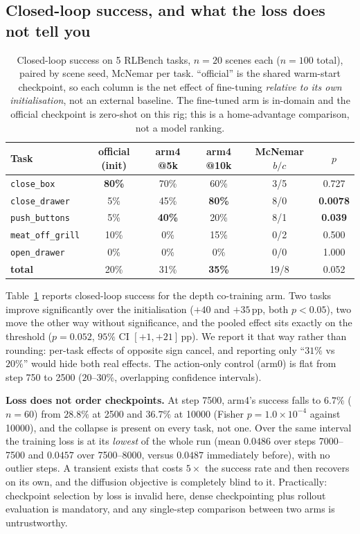 \documentclass{article} %
\newcommand{\best}[1]{\textbf{#1}}
\newcommand{\tabref}[1]{Table~\ref{#1}}
\begin{document}
\subsection{Closed-loop success, and what the loss does not tell you}

\begin{table}[t]
\caption{Closed-loop success on 5 RLBench tasks, $n{=}20$ scenes each ($n{=}100$ total), paired by
scene seed, McNemar per task. ``official'' is the shared warm-start checkpoint, so each column is
the net effect of fine-tuning \emph{relative to its own initialisation}, not an external baseline.
The fine-tuned arm is in-domain and the official checkpoint is zero-shot on this rig; this is a
home-advantage comparison, not a model ranking.}
\label{tab:closedloop}
\begin{center}\small
\begin{tabular}{lccccc}
\toprule
\textbf{Task} & official (init) & arm4 @5k & arm4 @10k & McNemar $b/c$ & $p$ \\
\midrule
\texttt{close\_box}       & \best{80\%} & 70\% & 60\% & 3/5 & 0.727 \\
\texttt{close\_drawer}    & 5\%  & 45\% & \best{80\%} & 8/0 & \best{0.0078} \\
\texttt{push\_buttons}    & 5\%  & \best{40\%} & 20\% & 8/1 & \best{0.039} \\
\texttt{meat\_off\_grill} & 10\% & 0\%  & 15\% & 0/2 & 0.500 \\
\texttt{open\_drawer}     & 0\%  & 0\%  & 0\%  & 0/0 & 1.000 \\
\midrule
\textbf{total} & 20\% & 31\% & \best{35\%} & 19/8 & 0.052 \\
\bottomrule
\end{tabular}
\end{center}
\end{table}

\tabref{tab:closedloop} reports closed-loop success for the depth co-training arm. Two tasks
improve significantly over the initialisation ($+40$ and $+35$\,pp, both $p<0.05$), two move the
other way without significance, and the pooled effect sits exactly on the threshold ($p=0.052$,
$95\%$ CI $[+1,+21]$\,pp). We report it that way rather than rounding: per-task effects of opposite
sign cancel, and reporting only ``$31\%$ vs $20\%$'' would hide both real effects. The action-only
control (arm0) is flat from step 750 to 2500 ($20$--$30\%$, overlapping confidence intervals).

\textbf{Loss does not order checkpoints.} At step 7500, arm4's success falls to $6.7\%$ ($n{=}60$)
from $28.8\%$ at 2500 and $36.7\%$ at 10000 (Fisher $p=1.0\times10^{-4}$ against 10000), and the
collapse is present on every task, not one. Over the same interval the training loss is at its
\emph{lowest} of the whole run (mean $0.0486$ over steps 7000--7500 and $0.0457$ over 7500--8000,
versus $0.0487$ immediately before), with no outlier steps. A transient exists that costs $5\times$
the success rate and then recovers on its own, and the diffusion objective is completely blind to
it. Practically: checkpoint selection by loss is invalid here, dense checkpointing plus rollout
evaluation is mandatory, and any single-step comparison between two arms is untrustworthy.
\end{document}
